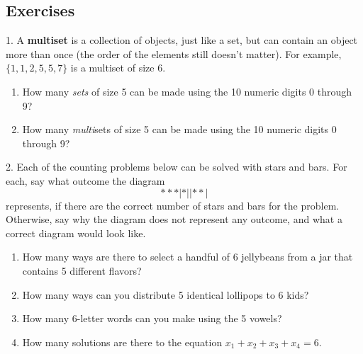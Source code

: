 \documentclass[10pt,]{book}
\newcommand{\terminology}[1]{\textbf{#1}}
\theoremstyle{plain}
\theoremstyle{definition}
\numberwithin{equation}{chapter}
\begin{document}
\subsection[Exercises]{Exercises}\label{exercises_stars-and-bars}
\begin{exerciselist}
\item[1.]\hypertarget{exercise-95}{}
                A
                \terminology{multiset}
                is a collection of objects, just like a set, but can contain an object more than once (the order of the elements still doesn't matter). For example,
                \(\{1,1, 2, 5, 5, 7\}\)
                is a multiset of size 6.
            \leavevmode%
\begin{enumerate}[label=(\alph*)]
\item\hypertarget{li-315}{}
                        How many
                        \emph{sets}
                        of size 5 can be made using the 10 numeric digits 0 through 9?
\item\hypertarget{li-316}{}
                        How many
                        \emph{multi}sets of size 5 can be made using the 10 numeric digits 0 through 9?
\end{enumerate}

\par\smallskip
\item[2.]\hypertarget{exercise-96}{}
                Each of the counting problems below can be solved with stars and bars. For each, say what outcome the diagram
                \begin{equation*}
                    ***|*||**|
                \end{equation*}
                represents, if there are the correct number of stars and bars for the problem. Otherwise, say why the diagram does not represent any outcome, and what a correct diagram would look like.
            \leavevmode%
\begin{enumerate}[label=(\alph*)]
\item\hypertarget{li-319}{}
                        How many ways are there to select a handful of 6 jellybeans from a jar that contains 5 different flavors?
\item\hypertarget{li-320}{}
                        How many ways can you distribute 5 identical lollipops to 6 kids?
\item\hypertarget{li-321}{}
                        How many 6-letter words can you make using the 5 vowels?
\item\hypertarget{li-322}{}
                        How many solutions are there to the equation
                        \(x_1 + x_2 + x_3 + x_4 = 6\).
\end{enumerate}


\end{exerciselist}
\end{document}
